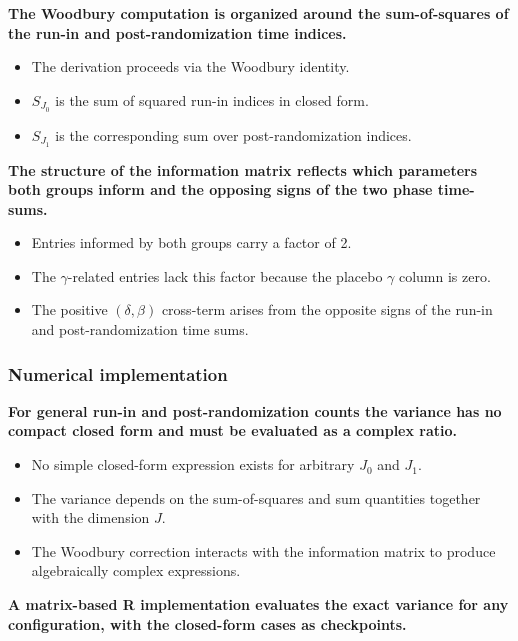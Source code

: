 \documentclass[
  11pt,
]{article}
\begin{document}
\textbf{The Woodbury computation is organized around the sum-of-squares of the run-in and post-randomization time indices.}

\begin{itemize}\setlength{\itemsep}{2pt}\setlength{\parskip}{0pt}
\item The derivation proceeds via the Woodbury identity.
\item $S_{J_0}$ is the sum of squared run-in indices in closed form.
\item $S_{J_1}$ is the corresponding sum over post-randomization indices.
\end{itemize}

\textbf{The structure of the information matrix reflects which parameters both groups inform and the opposing signs of the two phase time-sums.}

\begin{itemize}\setlength{\itemsep}{2pt}\setlength{\parskip}{0pt}
\item Entries informed by both groups carry a factor of 2.
\item The $\gamma$-related entries lack this factor because the placebo $\gamma$ column is zero.
\item The positive $(\delta, \beta)$ cross-term arises from the opposite signs of the run-in and post-randomization time sums.
\end{itemize}

\subsubsection{Numerical implementation}\label{numerical-implementation}

\textbf{For general run-in and post-randomization counts the variance has no compact closed form and must be evaluated as a complex ratio.}

\begin{itemize}\setlength{\itemsep}{2pt}\setlength{\parskip}{0pt}
\item No simple closed-form expression exists for arbitrary $J_0$ and $J_1$.
\item The variance depends on the sum-of-squares and sum quantities together with the dimension $J$.
\item The Woodbury correction interacts with the information matrix to produce algebraically complex expressions.
\end{itemize}

\textbf{A matrix-based R implementation evaluates the exact variance for any configuration, with the closed-form cases as checkpoints.}
\end{document}
